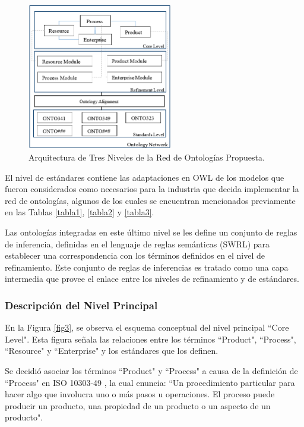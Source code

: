 \documentclass[journal]{IEEEtran}
\begin{document}
\begin{figure}[!t]
\centering
\includegraphics[width=2.5in]{figures/figure2.png}
\caption{Arquitectura de Tres Niveles de la Red de Ontolog\'ias Propuesta.}
\label{fig2}
\end{figure}

El nivel de est\'andares contiene las adaptaciones en OWL de los modelos que fueron considerados como necesarios para la industria que decida implementar la red de ontolog\'ias, algunos de los cuales se encuentran mencionados previamente en las Tablas \ref{tabla1}, \ref{tabla2} y \ref{tabla3}. 

Las ontolog\'ias integradas en este \'ultimo nivel se les define un conjunto de reglas de inferencia, definidas en el lenguaje de reglas sem\'anticas (SWRL) para establecer una correspondencia con los t\'erminos definidos en el nivel de refinamiento. Este conjunto de reglas de inferencias es tratado como una capa intermedia que provee el enlace entre los niveles de refinamiento y de est\'andares.

\subsubsection{Descripci\'on del Nivel Principal}

En la Figura \ref{fig3}, se observa el esquema conceptual del nivel principal ``Core Level". Esta figura señala las relaciones entre los t\'erminos ``Product", ``Process", ``Resource" y ``Enterprise" y los est\'andares que los definen.

Se decidi\'o asociar los t\'erminos ``Product" y ``Process" a causa de la definici\'on de ``Process" en ISO 10303-49 \cite{ISOProperties}, la cual enuncia: ``Un procedimiento particular para hacer algo que involucra uno o m\'as pasos u operaciones. El proceso puede producir un producto, una propiedad de un producto o un aspecto de un producto". 
\end{document}
